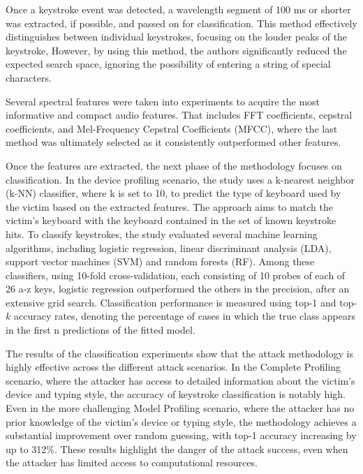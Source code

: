 \documentclass[a4paper,11pt,twoside]{report}
\theoremstyle{definition}
\begin{document}
Once a keystroke event was detected, a wavelength segment of 100 ms or shorter was extracted, if possible, and passed on for classification. This method effectively distinguishes between individual keystrokes, focusing on the louder peaks of the keystroke, However, by using this method, the authors significantly reduced the expected search space, ignoring the possibility of entering a string of special characters.

Several spectral features were taken into experiments to acquire the most informative and compact audio features. That includes FFT coefficients, cepstral coefficients, and Mel-Frequency Cepstral Coefficients (MFCC), where the last method was ultimately selected as it consistently outperformed other features.

Once the features are extracted, the next phase of the methodology focuses on classification. In the device profiling scenario, the study uses a k-nearest neighbor (k-NN) classifier, where k is set to 10, to predict the type of keyboard used by the victim based on the extracted features. The approach aims to match the victim's keyboard with the keyboard contained in the set of known keystroke hits. To classify keystrokes, the study evaluated several machine learning algorithms, including logistic regression, linear discriminant analysis (LDA), support vector machines (SVM) and random forests (RF). Among these classifiers, using 10-fold cross-validation, each consisting of 10 probes of each of 26 a-z keys, logistic regression outperformed the others in the precision, after an extensive grid search. Classification performance is measured using top-1 and top-$k$ accuracy rates, denoting the percentage of cases in which the true class appears in the first n predictions of the fitted model.

The results of the classification experiments show that the attack methodology is highly effective across the different attack scenarios. In the Complete Profiling scenario, where the attacker has access to detailed information about the victim’s device and typing style, the accuracy of keystroke classification is notably high. Even in the more challenging Model Profiling scenario, where the attacker has no prior knowledge of the victim’s device or typing style, the methodology achieves a substantial improvement over random guessing, with top-1 accuracy increasing by up to 312\%. These results highlight the danger of the attack success, even when the attacker has limited access to computational resources. \\
\end{document}
